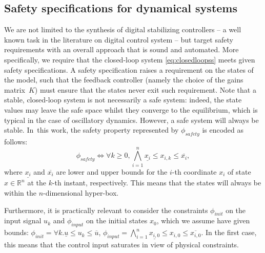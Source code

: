 \documentclass[runningheads,a4paper]{llncs}
\newcommand{\addtodo}[1]{{\color{red} TODO: #1}}
\begin{document}
\subsection{Safety specifications for dynamical systems}
\label{ssec:safety}

We are not limited to the synthesis of digital stabilizing controllers -- a
well known task in the literature on digital control system -- but target
safety requirements with an overall approach that is sound and automated. 
More specifically, we require that the closed-loop system
\eqref{eq:closedloopss} meets given safety specifications.  A safety
specification raises a requirement on the states of the model, such that the
feedback controller (namely the choice of the gains matrix~$K$) must ensure
that the states never exit such requirement.  Note that a stable,
closed-loop system is not necessarily a safe system: indeed, the state
values may leave the safe space whilst they converge to the equilibrium,
which is typical in the case of oscillatory dynamics.  However, a safe
system will always be stable.  In~this work, the safety property represented
by $\phi_\mathit{safety}$ is encoded as follows:
%
\begin{equation}
\label{eq:safetyliteral}
\phi_\mathit{safety}\iff \forall k\geq 0, \bigwedge_{i=1}^{n}{\underline{x_{i}} \leq x_{i,k} \leq \overline{x_{i}}},
\end{equation}
%
%
where $\underline{x_{i}}$ and $\overline{x_{i}}$ are lower and upper bounds
for the $i$-th coordinate $x_{i}$ of state $x\in \mathbb R^n$ at the $k$-th
instant, respectively.  This means that the states will always be within the
$n$-dimensional hyper-box.

Furthermore, it is practically relevant to consider the 
constraints $\phi_\mathit{init}$ on the input
signal $u_{k}$ and $\phi_\mathit{input}$ on the initial states $x_0$,
which we assume have given bounds:
$\phi_\mathit{init} = {\forall k.\underline{u} \leq u_{k} \leq \overline{u}} $, 
$\phi_\mathit{input} = \bigwedge_{i=1}^{n} \underline{x_{i,0}} \leq x_{i,0} \leq \overline{x_{i,0}}.$
In the first case, this means that the control input saturates in view of
physical constraints.

\end{document}
